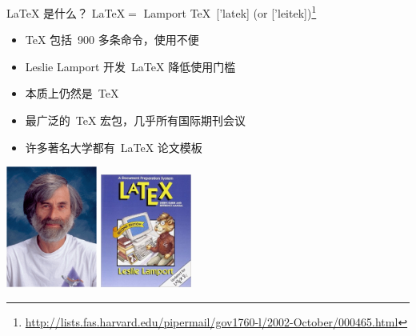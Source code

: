 \documentclass[dvipsnames, svgnames,
               mode=present, paper=screen,
               size=9pt, style=husky]{powerdot}
\begin{document}
\begin{slide}{\LaTeX{} 是什么？}
\LaTeX $=$ Lamport \TeX~['latek] (or ['leitek])\footnote{\url{http://lists.fas.harvard.edu/pipermail/gov1760-l/2002-October/000465.html}}
  \begin{itemize}
  \item \TeX{} 包括~900 多条命令，使用不便
  \item Leslie Lamport 开发~\LaTeX{} 降低使用门槛
  \item 本质上仍然是~\TeX{}
  \item 最广泛的~\TeX{} 宏包，几乎所有国际期刊会议
  \item 许多著名大学都有~\LaTeX{} 论文模板
  \end{itemize}
\bigskip

\centering
\includegraphics[width=3cm]{lamport.jpg}\hspace{2cm}%
\includegraphics[width=3cm]{latex.jpg}
\end{slide}
\end{document}
